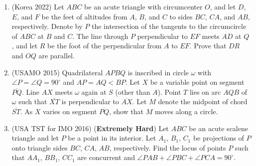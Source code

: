 \documentclass[12pt]{scrartcl}
\begin{document}
\begin{enumerate}
\item (Korea 2022) Let $ABC$ be an acute triangle with circumcenter $O$, and let $D$, $E$, and $F$ be the feet of altitudes from $A$, $B$, and $C$ to sides $BC$, $CA$, and $AB$, respectively. Denote by $P$ the intersection of the tangents to the circumcircle of $ABC$ at $B$ and $C$. The line through $P$ perpendicular to $EF$ meets $AD$ at $Q$, and let $R$ be the foot of the perpendicular from $A$ to $EF$. Prove that $DR$ and $OQ$ are parallel.

\item (USAMO 2015) Quadrilateral $APBQ$ is inscribed in circle $\omega$ with $\angle P = \angle Q = 90^{\circ}$ and $AP = AQ < BP$. Let $X$ be a variable point on segment $\overline{PQ}$. Line $AX$ meets $\omega$ again at $S$ (other than $A$). Point $T$ lies on arc $AQB$ of $\omega$ such that $\overline{XT}$ is perpendicular to $\overline{AX}$. Let $M$ denote the midpoint of chord $\overline{ST}$. As $X$ varies on segment $\overline{PQ}$, show that $M$ moves along a circle.

\item (USA TST for IMO 2016) (\textbf{Extremely Hard}) Let $ABC$ be an acute scalene triangle and let $P$ be a point in its interior. Let $A_1$, $B_1$, $C_1$ be projections of $P$ onto triangle sides $BC$, $CA$, $AB$, respectively. Find the locus of points $P$ such that $AA_1$, $BB_1$, $CC_1$ are concurrent and $\angle PAB + \angle PBC + \angle PCA = 90^{\circ}$.
 \end{enumerate}
 
\end{document}
